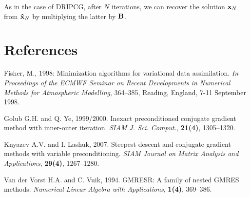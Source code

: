 \documentclass[12pt]{article}
\newcommand{\vect}[1]{{\bf #1}}                         %
\newcommand{\mat}[1]{{\bf #1}}                          %
\begin{document}
As in the case of DRIPCG, after $N$ iterations, we can recover the solution
$\vect{x}_N$ from $\vect{\hat x}_N$ by multiplying the latter by $\mat{B}$.

\section{References}

Fisher, M., 1998: Minimization algorithms for variational data assimilation.
{\it In Proceedings of the ECMWF Seminar on Recent Developments in Numerical
Methods for Atmospheric Modelling\/}, 364--385, Reading, England, 7-11
September 1998.

Golub G.H. and Q. Ye, 1999/2000. Inexact preconditioned conjugate gradient
method with inner-outer iteration.  {\it SIAM J. Sci. Comput.\/},
{\bf 21(4)}, 1305--1320.

Knyazev A.V. and I. Lashuk, 2007. Steepest descent and conjugate gradient
methods with variable preconditioning. {\it SIAM Journal on Matrix Analysis
and Applications\/}, {\bf 29(4)}, 1267--1280.

Van der Vorst H.A. and C. Vuik, 1994. GMRESR: A family of nested GMRES
methods. {\it Numerical Linear Algebra with Applications\/}, {\bf 1(4)},
369--386.
\end{document}
